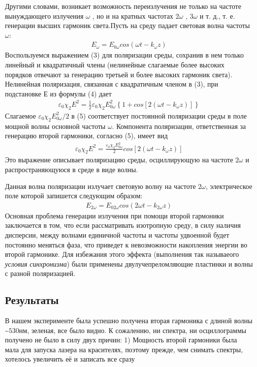 \documentclass[twocolumn]{article}
\begin{document}
Другими словами, возникает возможность переизлучения не только на
частоте вынуждающего излучения $\omega$ , но и на кратных частотах $2 \omega$ ,
$3 \omega$ и т. д., т. е. генерации высших гармоник света.Пусть на среду падает световая волна частоты $\omega$:\begin{align}
E_{\omega} = E_{0\omega}cos(\omega t - k_\omega z)
\end{align}Воспользуемся выражением (3) для поляризации среды, сохранив в нем
только линейный и квадратичный члены (нелинейные слагаемые более высоких
порядков отвечают за генерацию третьей и более высоких гармоник света).
Нелинейная поляризация, связанная с квадратичным членом в (3), при
подстановке $Е$ из формулы (4) дает\begin{align}
\varepsilon_0\chi_2E^2 = \frac{1}{2}\varepsilon_0 \chi_2 E^2_{0\omega}\left\{1+cos\left[2\left(\omega t - k_\omega z\right)\right]\right\}
\end{align}Слагаемое $\varepsilon_0\chi_2 E^2_{0 \omega}/2$ в (5) соответствует постоянной
поляризации среды в поле мощной волны основной частоты $\omega$. Компонента
поляризации, ответственная за генерацию второй гармоники, согласно
(5), имеет вид\begin{align}
\varepsilon_0\chi_2E^2 = \frac{\varepsilon_0 \chi_2 E^2_{0\omega}}{2}cos\left[2\left(\omega t - k_\omega z\right)\right]
\end{align}Это выражение описывает поляризацию среды, осциллирующую на частоте
$2 \omega$ и распространяющуюся в среде в виде волны.

Данная волна поляризации излучает световую волну на частоте $2 \omega$,
электрическое поле которой запишется следующим образом:\begin{align}
E_{2\omega} = E_{02\omega}cos(2\omega t - k_{2\omega} z)
\end{align}Основная проблема генерации излучения при помощи второй гармоники
заключается в том, что если рассматривать изотропную среду, в силу
наличия дисперсии, между волнами единичной частоты и частоты удвоенной
будет постоянно меняться фаза, что приведет к невозможности накопления
энергии во второй гармонике. Для избежания этого эффекта (выполнения так
называеого \emph{условия синхронизма}) были применены
двулучепреломляющие пластинки и волны с разной поляризацией.\subsection{Результаты}В нашем эксперименте была успешно получена вторая гармоника с длиной
волны \textasciitilde{}$530 нм$, зеленая, все было видно. К сожалению,
ни спектра, ни осциллограммы получено не было в силу двух причин: 1)
Мощность второй гармоники была мала для запуска лазера на красителях,
поэтому прежде, чем снимать спектры, хотелось увеличить её и записать
все сразу 
\end{document}
